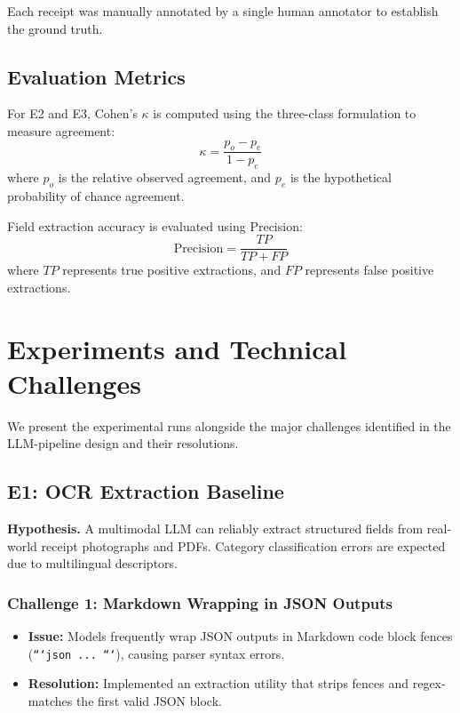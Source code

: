 \documentclass[11pt,a4paper]{article}
\begin{document}
Each receipt was manually annotated by a single human annotator to establish the ground truth.

\subsection{Evaluation Metrics}
For E2 and E3, Cohen's $\kappa$ is computed using the three-class formulation to measure agreement:
\begin{equation}
\kappa = \frac{p_o - p_e}{1 - p_e}
\end{equation}
where $p_o$ is the relative observed agreement, and $p_e$ is the hypothetical probability of chance agreement.

Field extraction accuracy is evaluated using Precision:
\begin{equation}
\text{Precision} = \frac{TP}{TP + FP}
\end{equation}
where $TP$ represents true positive extractions, and $FP$ represents false positive extractions.

\section{Experiments and Technical Challenges}

We present the experimental runs alongside the major challenges identified in the LLM-pipeline design and their resolutions.

\subsection{E1: OCR Extraction Baseline}
\textbf{Hypothesis.} A multimodal LLM can reliably extract structured fields from real-world receipt photographs and PDFs. Category classification errors are expected due to multilingual descriptors.

\subsubsection{Challenge 1: Markdown Wrapping in JSON Outputs}
\begin{itemize}
    \item \textbf{Issue:} Models frequently wrap JSON outputs in Markdown code block fences (\texttt{```json ... ```}), causing parser syntax errors.
    \item \textbf{Resolution:} Implemented an extraction utility that strips fences and regex-matches the first valid JSON block.
\end{itemize}
\end{document}
